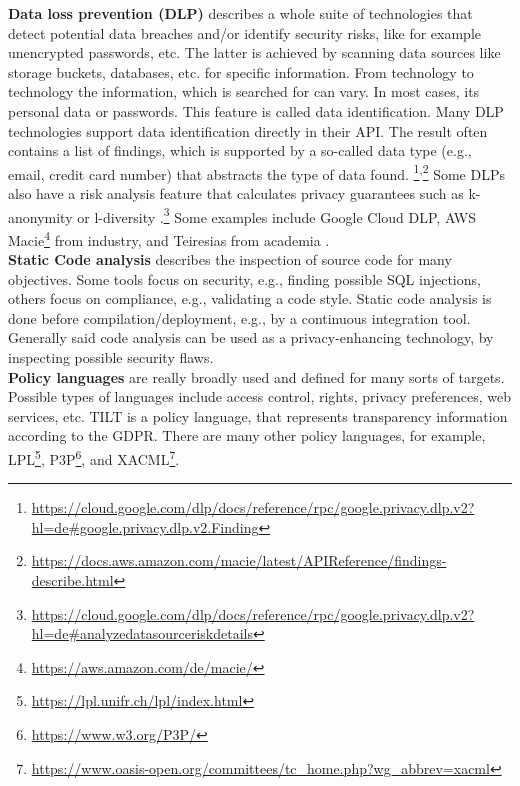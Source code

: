 \textbf{Data loss prevention (DLP)} describes a whole suite of technologies that detect potential data breaches and/or identify security risks, like for example unencrypted passwords, etc. The latter is achieved by scanning data sources like storage buckets, databases, etc. for specific information. \cite{zhang_what_2020} From technology to technology the information, which is searched for can vary. In most cases, its personal data or passwords. This feature is called data identification. \cite{kim_sensitive_2020} Many DLP technologies support data identification directly in their API. The result often contains a list of findings, which is supported by a so-called data type (e.g., email, credit card number) that abstracts the type of data found. \footnote{\url{https://cloud.google.com/dlp/docs/reference/rpc/google.privacy.dlp.v2?hl=de\#google.privacy.dlp.v2.Finding}}\textsuperscript{,}\footnote{\url{https://docs.aws.amazon.com/macie/latest/APIReference/findings-describe.html}} Some DLPs also have a risk analysis feature that calculates privacy guarantees such as k-anonymity \cite{sweeney_k-anonymity_2002} or l-diversity \cite{machanavajjhala_l_2007}.\footnote{\url{https://cloud.google.com/dlp/docs/reference/rpc/google.privacy.dlp.v2?hl=de\#analyzedatasourceriskdetails}} Some examples include Google Cloud DLP, AWS Macie\footnote{\url{https://aws.amazon.com/de/macie/}} from industry, and Teiresias from academia \cite{grunewald_teiresias_2022}.\\

\textbf{Static Code analysis} describes the inspection of source code for many objectives. \cite{novak_taxonomy_2010} Some tools focus on security, e.g., finding possible SQL injections, others focus on compliance, e.g., validating a code style. Static code analysis is done before compilation/deployment, e.g., by a continuous integration tool. Generally said code analysis can be used as a privacy-enhancing technology, by inspecting possible security flaws. \\

\textbf{Policy languages} are really broadly used and defined for many sorts of targets. Possible types of languages include access control, rights, privacy preferences, web services, etc. TILT is a policy language, that represents transparency information according to the GDPR. \cite{noauthor_review_nodate}
There are many other policy languages, for example, LPL\footnote{\url{https://lpl.unifr.ch/lpl/index.html}}, P3P\footnote{\url{https://www.w3.org/P3P/}}, and XACML\footnote{\url{https://www.oasis-open.org/committees/tc_home.php?wg_abbrev=xacml}}.



